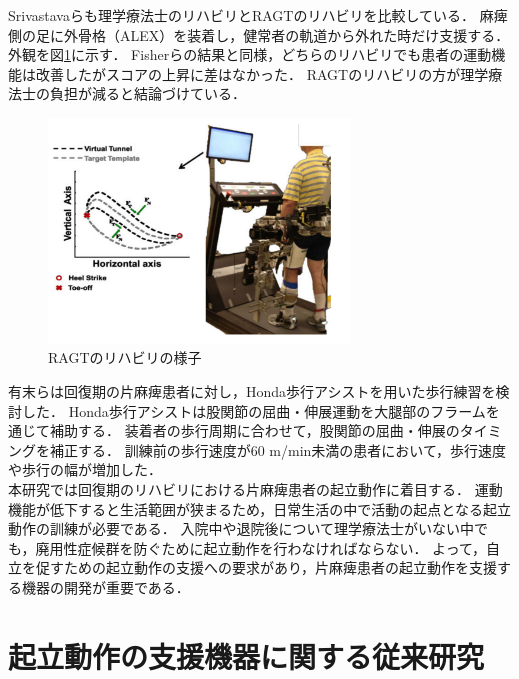 Srivastavaらも理学療法士のリハビリとRAGTのリハビリを比較している．
麻痺側の足に外骨格（ALEX）を装着し，健常者の軌道から外れた時だけ支援する．
外観を図\ref{fig:ALEX}に示す．
Fisherらの結果と同様，どちらのリハビリでも患者の運動機能は改善したがスコアの上昇に差はなかった．
RAGTのリハビリの方が理学療法士の負担が減ると結論づけている．

\begin{figure}[b]
	\begin{center}
		\includegraphics[width=8cm]{./Chap1/fig/ALEX.PNG}
		\caption{RAGTのリハビリの様子\cite{Srivastava2016}}
		\label{fig:ALEX}
	\end{center}
\end{figure}

有末らは回復期の片麻痺患者に対し，Honda歩行アシストを用いた歩行練習を検討した．
Honda歩行アシストは股関節の屈曲・伸展運動を大腿部のフラームを通じて補助する．
装着者の歩行周期に合わせて，股関節の屈曲・伸展のタイミングを補正する\cite{渡邊2016}．
訓練前の歩行速度が60 m/min未満の患者において，歩行速度や歩行の幅が増加した．\\

本研究では回復期のリハビリにおける片麻痺患者の起立動作に着目する．
運動機能が低下すると生活範囲が狭まる\cite{Guralnik1994}ため，日常生活の中で活動の起点となる起立動作の訓練が必要である．
入院中や退院後について理学療法士がいない中でも，廃用性症候群を防ぐために起立動作を行わなければならない．
よって，自立を促すための起立動作の支援への要求があり，片麻痺患者の起立動作を支援する機器の開発が重要である．

\clearpage


\section{起立動作の支援機器に関する従来研究}
\label{sec:related_research_chap1}

